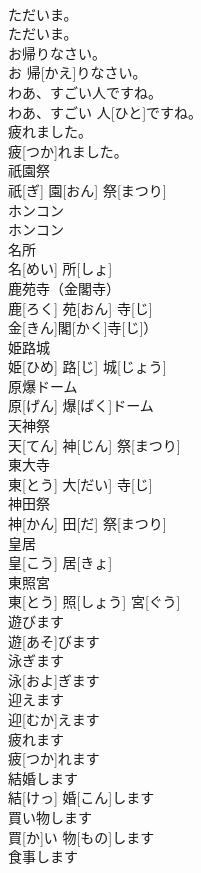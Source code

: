 \documentclass[8pt]{extreport}
\begin{document}
\begin{CJK}{UTF8}{min}
\\	ただいま。	
\\	ただいま。		
\\	お帰りなさい。	
\\	お 帰[かえ]りなさい。		
\\	わあ、すごい人ですね。	
\\	わあ、すごい 人[ひと]ですね。		
\\	疲れました。	
\\	疲[つか]れました。		
\\	祇園祭	
\\	祇[ぎ] 園[おん] 祭[まつり]		
\\	ホンコン	
\\	ホンコン		
\\	名所	
\\	名[めい] 所[しょ]		
\\	鹿苑寺（金閣寺）	
\\	鹿[ろく] 苑[おん] 寺[じ]
\\	金[きん]閣[かく]寺[じ]）		
\\	姫路城	
\\	姫[ひめ] 路[じ] 城[じょう]		
\\	原爆ドーム	
\\	原[げん] 爆[ばく]ドーム		
\\	天神祭	
\\	天[てん] 神[じん] 祭[まつり]		
\\	東大寺	
\\	東[とう] 大[だい] 寺[じ]		
\\	神田祭	
\\	神[かん] 田[だ] 祭[まつり]		
\\	皇居	
\\	皇[こう] 居[きょ]		
\\	東照宮	
\\	東[とう] 照[しょう] 宮[ぐう]		
\\	遊びます	
\\	遊[あそ]びます		
\\	泳ぎます	
\\	泳[およ]ぎます		
\\	迎えます	
\\	迎[むか]えます		
\\	疲れます	
\\	疲[つか]れます		
\\	結婚します	
\\	結[けっ] 婚[こん]します		
\\	買い物します	
\\	買[か]い 物[もの]します		
\\	食事します	

\end{CJK}
\end{document}
